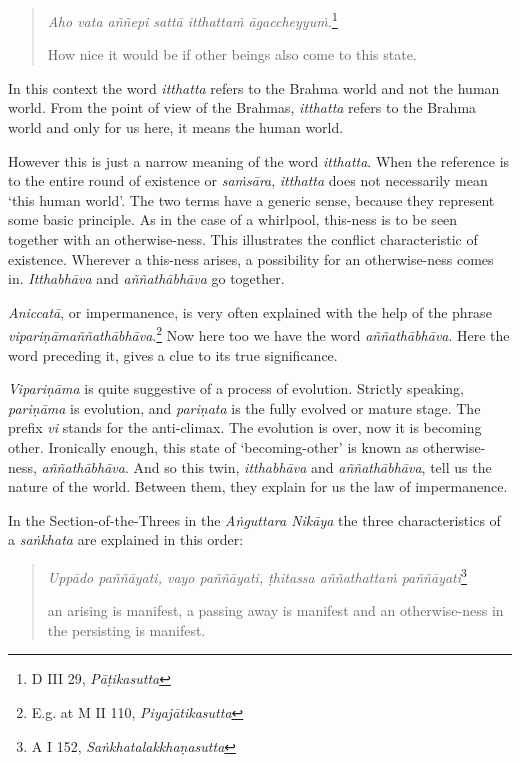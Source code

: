 \begin{quote}
\emph{Aho vata aññepi sattā itthattaṁ āgaccheyyuṁ.}\footnote{D III 29, \emph{Pāṭikasutta}}

How nice it would be if other beings also come to this state.
\end{quote}

In this context the word \emph{itthatta} refers to the Brahma world and not the human world. From the point of view of the Brahmas, \emph{itthatta} refers to the Brahma world and only for us here, it means the human world.

However this is just a narrow meaning of the word \emph{itthatta}. When the reference is to the entire round of existence or \emph{saṁsāra}, \emph{itthatta} does not necessarily mean `this human world'. The two terms have a generic sense, because they represent some basic principle. As in the case of a whirlpool, this-ness is to be seen together with an otherwise-ness. This illustrates the conflict characteristic of existence. Wherever a this-ness arises, a possibility for an otherwise-ness comes in. \emph{Itthabhāva} and \emph{aññathābhāva} go together.

\emph{Aniccatā}, or impermanence, is very often explained with the help of the phrase \emph{vipariṇāmaññathābhāva}.\footnote{E.g. at M II 110, \emph{Piyajātikasutta}} Now here too we have the word \emph{aññathābhāva}. Here the word preceding it, gives a clue to its true significance.

\emph{Vipariṇāma} is quite suggestive of a process of evolution. Strictly speaking, \emph{pariṇāma} is evolution, and \emph{pariṇata} is the fully evolved or mature stage. The prefix \emph{vi} stands for the anti-climax. The evolution is over, now it is becoming other. Ironically enough, this state of `becoming-other' is known as otherwise-ness, \emph{aññathābhāva}. And so this twin, \emph{itthabhāva} and \emph{aññathābhāva}, tell us the nature of the world. Between them, they explain for us the law of impermanence.

In the Section-of-the-Threes in the \emph{Aṅguttara Nikāya} the three characteristics of a \emph{saṅkhata} are explained in this order:

\begin{quote}
\emph{Uppādo paññāyati, vayo paññāyati, ṭhitassa aññathattaṁ paññāyati}\footnote{A I 152, \emph{Saṅkhatalakkhaṇasutta}}

an arising is manifest, a passing away is manifest and an otherwise-ness in the persisting is manifest.
\end{quote}


